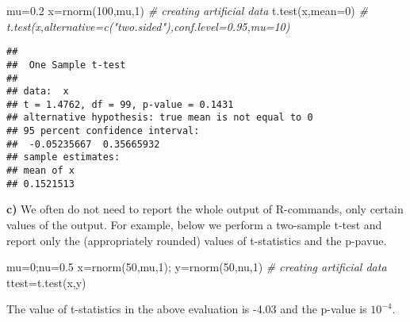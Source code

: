 \documentclass[
  11pt,
]{article}
\newenvironment{Shaded}{\begin{snugshade}}{\end{snugshade}}
\newcommand{\AttributeTok}[1]{\textcolor[rgb]{0.77,0.63,0.00}{#1}}
\newcommand{\CommentTok}[1]{\textcolor[rgb]{0.56,0.35,0.01}{\textit{#1}}}
\newcommand{\DecValTok}[1]{\textcolor[rgb]{0.00,0.00,0.81}{#1}}
\newcommand{\FloatTok}[1]{\textcolor[rgb]{0.00,0.00,0.81}{#1}}
\newcommand{\FunctionTok}[1]{\textcolor[rgb]{0.00,0.00,0.00}{#1}}
\newcommand{\NormalTok}[1]{#1}
\newcommand{\OtherTok}[1]{\textcolor[rgb]{0.56,0.35,0.01}{#1}}
\begin{document}
\begin{Shaded}
\begin{Highlighting}[]
\NormalTok{mu}\OtherTok{=}\FloatTok{0.2}
\NormalTok{x}\OtherTok{=}\FunctionTok{rnorm}\NormalTok{(}\DecValTok{100}\NormalTok{,mu,}\DecValTok{1}\NormalTok{) }\CommentTok{\# creating artificial data}
\FunctionTok{t.test}\NormalTok{(x,}\AttributeTok{mean=}\DecValTok{0}\NormalTok{)   }\CommentTok{\# t.test(x,alternative=c("two.sided"),conf.level=0.95,mu=10)}
\end{Highlighting}
\end{Shaded}

\begin{verbatim}
## 
##  One Sample t-test
## 
## data:  x
## t = 1.4762, df = 99, p-value = 0.1431
## alternative hypothesis: true mean is not equal to 0
## 95 percent confidence interval:
##  -0.05235667  0.35665932
## sample estimates:
## mean of x 
## 0.1521513
\end{verbatim}

\textbf{c)} We often do not need to report the whole output of
R-commands, only certain values of the output. For example, below we
perform a two-sample t-test and report only the (appropriately rounded)
values of t-statistics and the p-pavue.

\begin{Shaded}
\begin{Highlighting}[]
\NormalTok{mu}\OtherTok{=}\DecValTok{0}\NormalTok{;nu}\OtherTok{=}\FloatTok{0.5}
\NormalTok{x}\OtherTok{=}\FunctionTok{rnorm}\NormalTok{(}\DecValTok{50}\NormalTok{,mu,}\DecValTok{1}\NormalTok{); y}\OtherTok{=}\FunctionTok{rnorm}\NormalTok{(}\DecValTok{50}\NormalTok{,nu,}\DecValTok{1}\NormalTok{) }\CommentTok{\# creating artificial data}
\NormalTok{ttest}\OtherTok{=}\FunctionTok{t.test}\NormalTok{(x,y) }
\end{Highlighting}
\end{Shaded}

The value of t-statistics in the above evaluation is -4.03 and the
p-value is \ensuremath{10^{-4}}.
\end{document}
